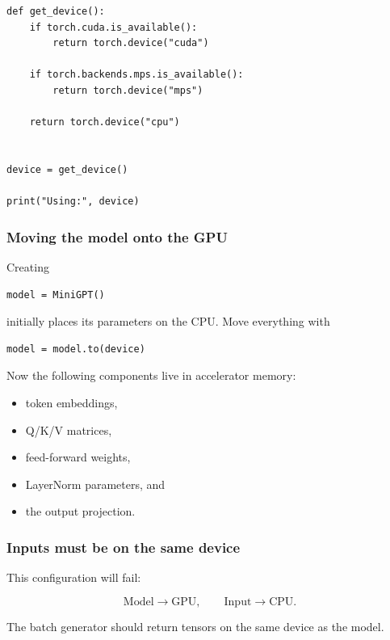 \begin{lstlisting}[style=shadedpython]
def get_device():
    if torch.cuda.is_available():
        return torch.device("cuda")

    if torch.backends.mps.is_available():
        return torch.device("mps")

    return torch.device("cpu")


device = get_device()

print("Using:", device)
\end{lstlisting}

\subsubsection*{Moving the model onto the GPU}

Creating

\begin{lstlisting}[style=shadedpython]
model = MiniGPT()
\end{lstlisting}

initially places its parameters on the CPU. Move everything with

\begin{lstlisting}[style=shadedpython]
model = model.to(device)
\end{lstlisting}

Now the following components live in accelerator memory:

\begin{itemize}
  \setlength{\itemsep}{0pt}
  \item token embeddings,
  \item Q/K/V matrices,
  \item feed-forward weights,
  \item LayerNorm parameters, and
  \item the output projection.
\end{itemize}

\subsubsection*{Inputs must be on the same device}

This configuration will fail:

\[
  \text{Model}\longrightarrow\text{GPU},
  \qquad
  \text{Input}\longrightarrow\text{CPU}.
\]

The batch generator should return tensors on the same device as the model. \\

